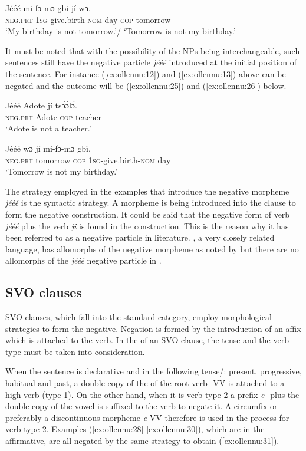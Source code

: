 \documentclass[output=paper,newtxmath,modfonts,nonflat,draftmode]{langsci/langscibook}
\begin{document}
\ea \label{ex:ollennu:24}
\gll Jééé mi-fɔ-mɔ gbi jí wɔ.\\
\textsc{neg}.\textsc{prt} 1\textsc{sg}-give.birth-\textsc{nom} day \textsc{cop} tomorrow\\
\glt 	`My birthday is not tomorrow.'/ `Tomorrow is not my birthday.'
\z

It must be noted that with the possibility of the NPs being interchangeable, such sentences still have the {negative particle} \textit{jééé} introduced at the initial position of the sentence. For instance (\ref{ex:ollennu:12}) and (\ref{ex:ollennu:13}) above can be negated and the outcome will be (\ref{ex:ollennu:25}) and (\ref{ex:ollennu:26}) below.

\ea \label{ex:ollennu:25}
 \gll Jééé Adote jí ts\`ɔ\'ɔl\`ɔ. \\
\textsc{neg}.\textsc{prt} Adote \textsc{cop} teacher\\
\glt `Adote is not a teacher.'
\z

\ea \label{ex:ollennu:26}
\gll Jééé wɔ jí mi-fɔ-mɔ gbì.\\
\textsc{neg}.\textsc{prt} tomorrow \textsc{cop} 1\textsc{sg}-give.birth-\textsc{nom} day\\
\glt `Tomorrow is not my birthday.'
\z


The strategy employed in the examples that introduce the negative morpheme \textit{jééé} is the syntactic strategy. A morpheme is being introduced into the clause to form the negative construction. It could be said that the negative form of  verb \textit{jééé} plus the  verb \textit{ji} is found in the construction. This is the reason why it has been referred to as a {negative particle} in  literature. , a very closely related language, has allomorphs of the negative morpheme as noted by \citet{caesar2012} but there are no allomorphs of the \textit{jééé} {negative particle} in .

\subsection{\label{sec:ollennu:2.3} SVO clauses}

SVO clauses, which fall into the standard  category, employ morphological strategies to form the negative. Negation is formed by the introduction of an affix which is attached to the verb. In the  of an SVO clause, the tense and the verb type must be taken into consideration.

When the sentence is declarative and in the following tense/: present, progressive, habitual and past, a double copy of the  of the root verb -VV is attached to a high  verb (type 1). On the other hand, when it is verb type 2 a prefix \textit{e-} plus the double copy of the vowel is suffixed to the verb to negate it. A circumfix or preferably a discontinuous morpheme \textit{e}-VV therefore is used in the  process for verb type 2. Examples (\ref{ex:ollennu:28}-\ref{ex:ollennu:30}), which are in the affirmative, are all negated by the same strategy to obtain (\ref{ex:ollennu:31}).
\end{document}
